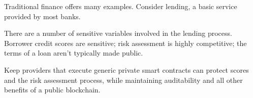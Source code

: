 \documentclass[11pt]{article}
\begin{document}
Traditional finance offers many examples. Consider lending, a basic
service provided by most banks.

There are a number of sensitive variables involved in the lending
process. Borrower credit scores are sensitive; risk assessment is
highly competitive; the terms of a loan aren't typically made public.

Keep providers that execute generic private smart contracts can
protect scores and the risk assessment process, while maintaining
auditability and all other benefits of a public blockchain.


{}
\end{document}
